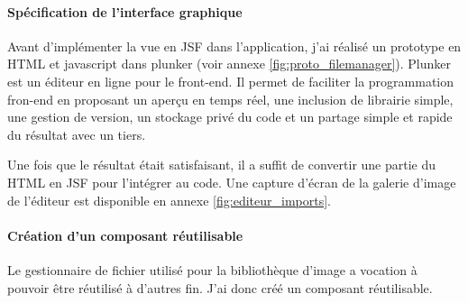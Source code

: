 \paragraph*{Spécification de l'interface graphique\\}
Avant d'implémenter la vue en JSF dans l'application, j'ai réalisé un prototype en HTML et javascript dans plunker (voir annexe \ref{fig:proto_filemanager}).
Plunker est un éditeur en ligne pour le front-end. Il permet de faciliter la programmation fron-end en proposant un aperçu en temps réel, une inclusion de librairie simple, une gestion de version, un stockage privé du code et un partage simple et rapide du résultat avec un tiers.

Une fois que le résultat était satisfaisant, il a suffit de convertir une partie du HTML en JSF pour l'intégrer au code.
Une capture d'écran de la galerie d'image de l'éditeur est disponible en annexe \ref{fig:editeur_imports}.

\paragraph*{Création d'un composant réutilisable\\}
Le gestionnaire de fichier utilisé pour la bibliothèque d'image a vocation à pouvoir être réutilisé à d'autres fin.
J'ai donc créé un composant réutilisable.

